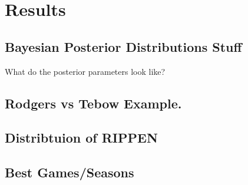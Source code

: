 \documentclass[aoas]{imsart}\usepackage[]{graphicx}\usepackage[]{color}
\begin{document}
% 	
% 	



\section{Results}
\subsection{Bayesian Posterior Distributions Stuff}
What do the posterior parameters look like? 

\subsection{Rodgers vs Tebow Example. }

\subsection{Distribtuion of RIPPEN}

\subsection{Best Games/Seasons}
\end{document}
